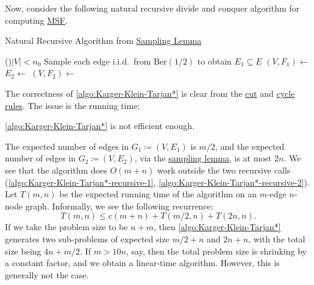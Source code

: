 Now, consider the following natural recursive divide and conquer algorithm for computing \hyperref[prb:MSF]{MSF}.

\begin{algorithm}[H]\label{algo:Karger-Klein-Tarjan*}
	\DontPrintSemicolon{}
	\caption{Natural Recursive Algorithm from \hyperref[lma:sampling]{Sampling Lemma}}
	\BlankLine
	\If(){\(\lvert V \rvert < n_0\)}{
	}
	\;
	Sample each edge i.i.d.\ from \(\mathrm{Ber} (1 / 2)\) to obtain \(E_1 \subseteq E\)\;
	\((V, F_1) \gets\)\label{algo:Karger-Klein-Tarjan*-recursive-1}
	\(E_2 \gets\)
	\((V, F_2) \gets\)\label{algo:Karger-Klein-Tarjan*-recursive-2}
	\;
\end{algorithm}

The correctness of \autoref{algo:Karger-Klein-Tarjan*} is clear from the \hyperref[lma:cut-rule]{cut} and \hyperref[lma:cycle-rule]{cycle rules}. The issue is the running time:

\begin{claim}
	\autoref{algo:Karger-Klein-Tarjan*} is not efficient enough.
\end{claim}
\begin{explanation}
	The expected number of edges in \(G_1 \coloneqq (V, E_1)\) is \(m / 2\), and the expected number of edges in \(G_2 \coloneqq (V, E_2)\), via the \hyperref[lma:sampling]{sampling lemma}, is at most \(2n\). We see that the algorithm does \(O(m + n)\) work outside the two recursive calls (\autoref{algo:Karger-Klein-Tarjan*-recursive-1}, \autoref{algo:Karger-Klein-Tarjan*-recursive-2}). Let \(T(m, n)\) be the expected running time of the algorithm on an \(m\)-edge \(n\)-node graph. Informally, we see the following recurrence:
	\[
		T(m, n)
		\leq c(m+n) + T(m / 2, n) + T(2n, n).
	\]
	If we take the problem size to be \(n + m\), then \autoref{algo:Karger-Klein-Tarjan*} generates two sub-problems of expected size \(m / 2 + n\) and \(2n + n\), with the total size being \(4n + m / 2\). If \(m > 10n\), say, then the total problem size is shrinking by a constant factor, and we obtain a linear-time algorithm. However, this is generally not the case.
\end{explanation}

